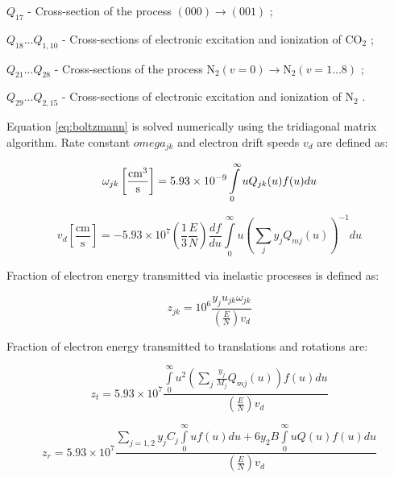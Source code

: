 \documentclass{report}
\begin{document}
$Q_{17}$ - Cross-section of the process $(000)\rightarrow(001)$  \cite{Lowke-1973};

$Q_{18}...Q_{1,10}$ - Cross-sections of electronic excitation and ionization of {CO$_2$}  \cite{Hake-1967};

$Q_{21}...Q_{28}$ - Cross-sections of the process {N$_2$}$(v=0)\rightarrow${N$_2$}$(v=1...8)$ \cite{Phelps-1968,Schulz-1962,Engelhardt-1964};

$Q_{29}...Q_{2,15}$ - Cross-sections of electronic excitation and ionization of {N$_2$} \cite{Engelhardt-1964}.  

Equation \ref{eq:boltzmann} is solved numerically using the tridiagonal matrix algorithm.
Rate constant $omega_{jk}$ and electron drift speeds $v_d$ are defined as:

\begin{equation}\label{eq:omega_jk}
\omega _{jk}\left[\frac{\rm{cm}^3}{\text{s}} \right] = 5.93 \times 10^{-9}\int\limits_0^\infty u Q_{jk}(u)f(u)du
\end{equation}
     
\begin{equation}\label{eq:v_d}
v_d \left[ \frac{\text{cm}}{\text{s}} \right] =  - 5.93 \times 10^7 \left( \frac{1}{3}\frac{E}{N} \right)\frac{df}{du} \int\limits_0^\infty u \left( \sum\limits_j y_j Q_{mj}(u) \right)^{-1} du
\end{equation}

Fraction of electron energy transmitted via inelastic processes is defined as:

\begin{equation}\label{eq:z_jk}
z_{jk} = 10^6 \frac{y_j u_{jk} \omega _{jk}} {\left( \frac{E}{N} \right) v_d}   
\end{equation}

Fraction of electron energy transmitted to translations and rotations are:

\begin{equation}\label{eq:z_t}
z_t = 5.93 \times 10^7 \frac{\int\limits_0^\infty u^2 \left( \sum\limits_j \frac{y_j}{M_j} Q_{mj}(u) \right)f(u)du} {\left( \frac{E}{N} \right) v_d}
\end{equation}

\begin{equation}\label{eq:z_r}
z_r = 5.93 \times 10^7 \frac{\sum\limits_{j=1,2} y_j C_j \int\limits_0^\infty uf(u)du + 6 y_2 B \int\limits_0^\infty u Q(u) f(u) du} {\left( \frac{E}{N} \right) v_d} 
\end{equation}
\end{document}
